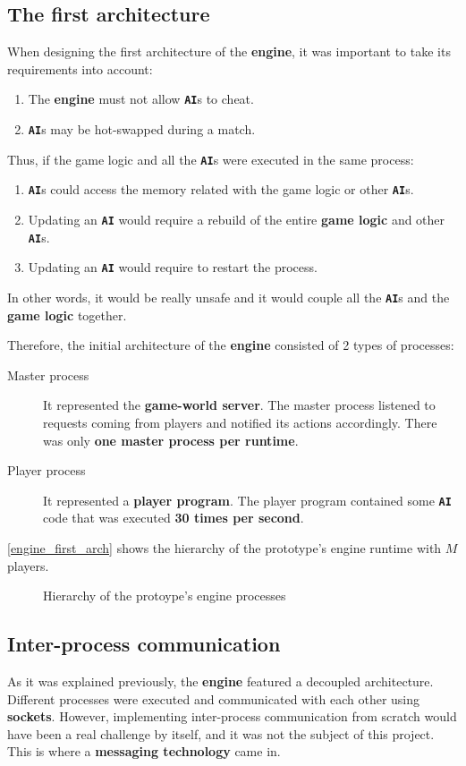 \documentclass[a4paper,11pt,titlepage,abstract,numbers=noenddot,automark,mnsy,intlimits,rgb,dvipsnames]{report}
\begin{document}
\subsection{The first architecture}
When designing the first architecture of the \textbf{engine}, it was important to take its requirements into account:
\begin{enumerate}
\item
The \textbf{engine} must not allow \textbf{\texttt{AI}}s to cheat.
\item
\textbf{\texttt{AI}}s may be hot-swapped during a match.
\end{enumerate}
Thus, if the game logic and all the \textbf{\texttt{AI}}s were executed in the same process:
\begin{enumerate}
\item
\textbf{\texttt{AI}}s could access the memory related with the game logic or other \textbf{\texttt{AI}}s.
\item
Updating an \textbf{\texttt{AI}} would require a rebuild of the entire \textbf{game logic} and other \textbf{\texttt{AI}}s.
\item
Updating an \textbf{\texttt{AI}} would require to restart the process.
\end{enumerate}
In other words, it would be really unsafe and it would couple all the \textbf{\texttt{AI}}s and the \textbf{game logic} together.

Therefore, the initial architecture of the \textbf{engine} consisted of 2 types of processes:
\begin{description}
\item[Master process]
It represented the \textbf{game-world server}. The master process listened to requests coming from
players and notified its actions accordingly. There was only \textbf{one master process per runtime}.
\item[Player process]
It represented a \textbf{player program}. The player program contained some \textbf{\texttt{AI}} code that was
  executed \textbf{30 times per second}.
\end{description}
\autoref{engine_first_arch} shows the hierarchy of the prototype's engine runtime with $M$ players.
\begin{figure}[H]
\begin{center}

\end{center}
\caption{Hierarchy of the protoype's engine processes}
\label{engine_first_arch}
\end{figure}
\subsection{Inter-process communication}
As it was explained previously, the \textbf{engine} featured a decoupled architecture. Different processes were
executed and communicated with each other using \textbf{sockets}. However, implementing inter-process communication from
scratch would have been a real challenge by itself, and it was not the subject of this project. This is where a
\textbf{messaging technology} came in.
\end{document}
